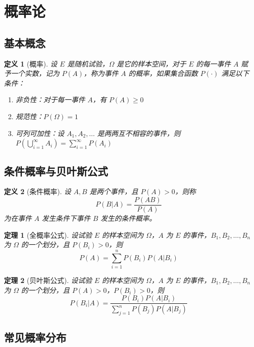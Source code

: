 \documentclass[12pt]{article}
\newtheorem{theorem}{定理}
\newtheorem{definition}{定义}
\begin{document}
\section{概率论}

\subsection{基本概念}

\begin{definition}[概率]
设 $E$ 是随机试验，$\Omega$ 是它的样本空间，对于 $E$ 的每一事件 $A$ 赋予一个实数，记为 $P(A)$，称为事件 $A$ 的概率，如果集合函数 $P(\cdot)$ 满足以下条件：
\begin{enumerate}
    \item 非负性：对于每一事件 $A$，有 $P(A) \geq 0$
    \item 规范性：$P(\Omega) = 1$
    \item 可列可加性：设 $A_1, A_2, \ldots$ 是两两互不相容的事件，则 $P\left(\bigcup_{i=1}^{\infty} A_i\right) = \sum_{i=1}^{\infty} P(A_i)$
\end{enumerate}
\end{definition}

\subsection{条件概率与贝叶斯公式}

\begin{definition}[条件概率]
设 $A, B$ 是两个事件，且 $P(A) > 0$，则称
$$P(B|A) = \frac{P(AB)}{P(A)}$$
为在事件 $A$ 发生条件下事件 $B$ 发生的条件概率。
\end{definition}

\begin{theorem}[全概率公式]
设试验 $E$ 的样本空间为 $\Omega$，$A$ 为 $E$ 的事件，$B_1, B_2, \ldots, B_n$ 为 $\Omega$ 的一个划分，且 $P(B_i) > 0$，则
$$P(A) = \sum_{i=1}^{n} P(B_i) P(A|B_i)$$
\end{theorem}

\begin{theorem}[贝叶斯公式]
设试验 $E$ 的样本空间为 $\Omega$，$A$ 为 $E$ 的事件，$B_1, B_2, \ldots, B_n$ 为 $\Omega$ 的一个划分，且 $P(A) > 0$，$P(B_i) > 0$，则
$$P(B_i|A) = \frac{P(B_i) P(A|B_i)}{\sum_{j=1}^{n} P(B_j) P(A|B_j)}$$
\end{theorem}

\subsection{常见概率分布}
\end{document}
